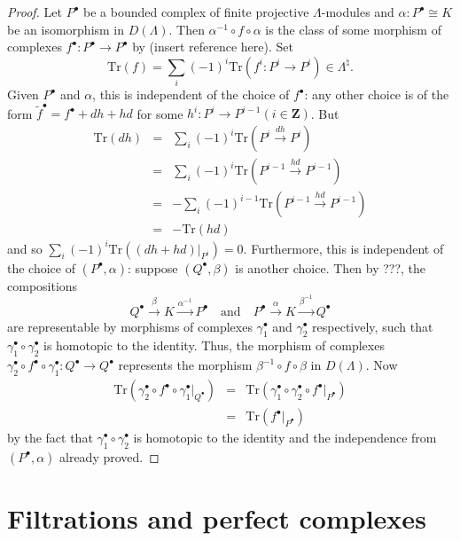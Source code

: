 \begin{proof}
Let $P^\bullet$ be a bounded complex of finite projective $\Lambda$-modules and
$\alpha: P^\bullet \cong K$ be an isomorphism in $D(\Lambda)$. Then
$\alpha^{-1}\circ f\circ \alpha$ is the class of some morphism of complexes
$f^\bullet: P^\bullet \to P^\bullet$ by (insert reference here).
Set
$$
\text{Tr}(f) = \sum_i (-1)^i \text{Tr}(f^i: P^i \to P^i) \in \Lambda^\natural.
$$
Given $P^\bullet$ and $\alpha$, this is independent of the choice of
$f^\bullet$: any other choice is of the form $\tilde{f}^\bullet = f^\bullet +
dh +hd$ for some $h^i: P^i \to P^{i-1}(i\in \mathbf{Z})$. But
\begin{eqnarray*}
\text{Tr}(dh) & = & \sum_i (-1)^i \text{Tr}(P^i\xrightarrow{dh} P^i) \\
& = & \sum_i (-1)^i \text{Tr}(P^{i-1}\xrightarrow{hd} P^{i-1}) \\
& = & -\sum_i (-1)^{i-1}\text{Tr}(P^{i-1}\xrightarrow{hd} P^{i-1}) \\
& = &- \text{Tr}(hd)
\end{eqnarray*}
and so $\sum_i (-1)^i \text{Tr} ((dh+hd)|_{P^i})=0$.
Furthermore, this is independent of the choice of $(P^\bullet , \alpha)$:
suppose $(Q^\bullet, \beta)$ is another choice. Then by ???, the compositions
$$
Q^\bullet \xrightarrow{\beta} K \xrightarrow{\alpha^{-1}} P^\bullet
\quad\text{and}\quad
P^\bullet \xrightarrow{\alpha} K \xrightarrow{\beta^{-1}} Q^\bullet
$$
are representable by morphisms of complexes $\gamma_1^\bullet$ and
$\gamma_2^\bullet$ respectively, such that $\gamma_1^\bullet \circ
\gamma_2^\bullet$ is homotopic to the identity. Thus, the morphism of complexes
$\gamma_2^\bullet\circ f^\bullet\circ \gamma_1^\bullet: Q^\bullet\to Q^\bullet$
represents the morphism $\beta^{-1}\circ f\circ\beta$ in $D(\Lambda)$. Now
\begin{eqnarray*}
\text{Tr}(\gamma_2^\bullet\circ f^\bullet\circ\gamma_1^\bullet|_{Q^\bullet}) &
= & \text{Tr}(\gamma_1^\bullet \circ\gamma_2^\bullet \circ
f^\bullet|_{P^\bullet})\\
& = & \text{Tr}(f^\bullet|_{P^\bullet})
\end{eqnarray*}
by the fact that $\gamma_1^\bullet \circ \gamma_2^\bullet$ is homotopic to the
identity and the independence from $(P^\bullet, \alpha)$ already proved.
\end{proof}




\section{Filtrations and perfect complexes}
\label{section-filtrations-perfect}

